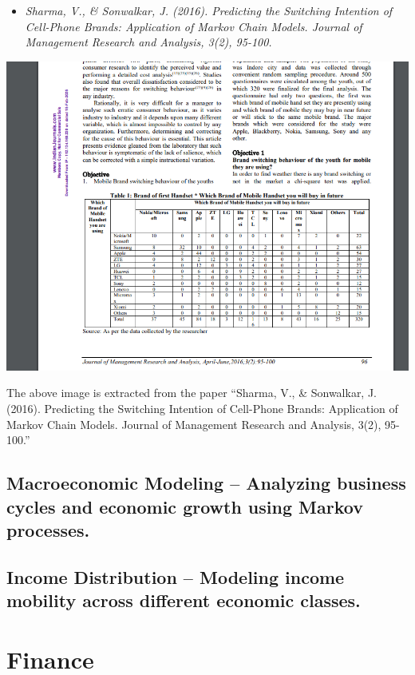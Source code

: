 \documentclass[
  letterpaper,
  DIV=11,
  numbers=noendperiod]{scrreprt}
\providecommand{\tightlist}{%
  \setlength{\itemsep}{0pt}\setlength{\parskip}{0pt}}\usepackage{longtable,booktabs,array}
\begin{document}
\begin{itemize}
\tightlist
\item
  \emph{Sharma, V., \& Sonwalkar, J. (2016). Predicting the Switching
  Intention of Cell-Phone Brands: Application of Markov Chain Models.
  Journal of Management Research and Analysis, 3(2), 95-100.}
\end{itemize}

\includegraphics{ch6.1.png}

The above image is extracted from the paper ``Sharma, V., \& Sonwalkar,
J. (2016). Predicting the Switching Intention of Cell-Phone Brands:
Application of Markov Chain Models. Journal of Management Research and
Analysis, 3(2), 95-100.''

\subsection{Macroeconomic Modeling -- Analyzing business cycles and
economic growth using Markov
processes.}\label{macroeconomic-modeling-analyzing-business-cycles-and-economic-growth-using-markov-processes.}

\subsection{Income Distribution -- Modeling income mobility across
different economic
classes.}\label{income-distribution-modeling-income-mobility-across-different-economic-classes.}

\section{Finance}\label{finance}
\end{document}
